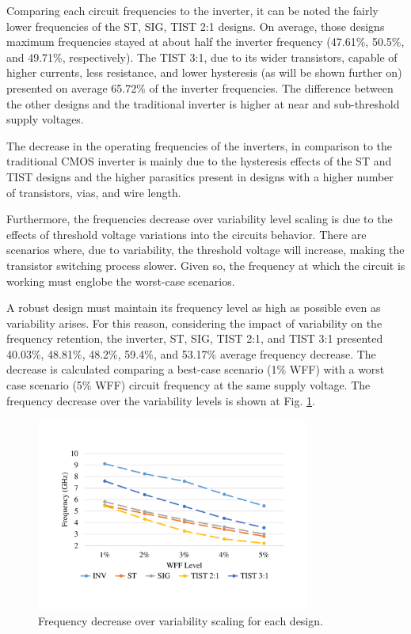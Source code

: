 \documentclass[pgmicro,diss,english]{iiufrgs}
\begin{document}
Comparing each circuit frequencies to the inverter, it can be noted the fairly lower frequencies of the ST, SIG, TIST 2:1 designs. On average, those designs maximum frequencies stayed at about half the inverter frequency (47.61\%, 50.5\%, and 49.71\%, respectively). The TIST 3:1, due to its wider transistors, capable of higher currents,  less resistance, and lower hysteresis (as will be shown further on) presented on average 65.72\% of the inverter frequencies. The difference between the other designs and the traditional inverter is higher at near and sub-threshold supply voltages.

The decrease in the operating frequencies of the inverters, in comparison to the traditional CMOS inverter is mainly due to the hysteresis effects of the ST and TIST designs and the higher parasitics present in designs with a higher number of transistors, vias, and wire length.

Furthermore, the frequencies decrease over variability level scaling is due to the effects of threshold voltage variations into the circuits behavior. There are scenarios where, due to variability, the threshold voltage will increase, making the transistor switching process slower. Given so, the frequency at which the circuit is working must englobe the worst-case scenarios.

A robust design must maintain its frequency level as high as possible even as variability arises. For this reason, considering the impact of variability on the frequency retention, the inverter, ST, SIG, TIST 2:1, and TIST 3:1 presented 40.03\%, 48.81\%, 48.2\%, 59.4\%, and 53.17\% average frequency decrease. The decrease is calculated comparing a best-case scenario (1\% WFF) with a worst case scenario (5\% WFF) circuit frequency at the same supply voltage. The frequency decrease over the variability levels is shown at Fig. \ref{fig:freqRetWFF}.

\begin{figure}[]
\centering
\includegraphics[width=0.8\textwidth, trim={2cm 3cm 2cm 3cm},clip]{freqRetWFF.pdf}
\caption{Frequency decrease over variability scaling for each design.}
\label{fig:freqRetWFF}
\end{figure}
\end{document}
